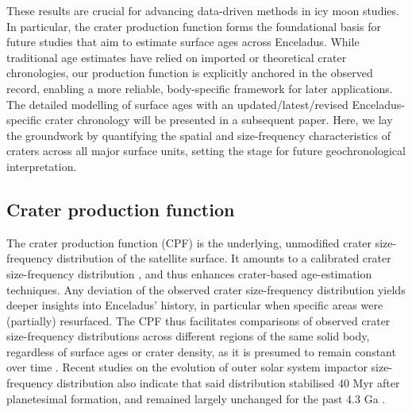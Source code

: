 \documentclass[preprint,12pt,3p,times,authoryear]{elsarticle}
\begin{document}
These results are crucial for advancing data-driven methods in icy moon studies. In particular, the crater production function forms the foundational basis for future studies that aim to estimate surface ages across Enceladus. While traditional age estimates have relied on imported or theoretical crater chronologies, our production function is explicitly anchored in the observed record, enabling a more reliable, body-specific framework for later applications. \\

The detailed modelling of surface ages with an updated/latest/revised Enceladus-specific crater chronology will be presented in a subsequent paper. Here, we lay the groundwork by quantifying the spatial and size-frequency characteristics of craters across all major surface units, setting the stage for future geochronological interpretation.

\subsection{Crater production function}
\label{sub:intro_cpf}
The crater production function (CPF) is the underlying, unmodified crater size-frequency distribution of the satellite surface. It amounts to a calibrated crater size-frequency distribution \citep{Neukum1975}, and thus enhances crater-based age-estimation techniques.
Any deviation of the observed crater size-frequency distribution yields deeper insights into Enceladus’ history, in particular when specific areas were (partially) resurfaced. The CPF thus facilitates comparisons of observed crater size-frequency distributions across different regions of the same solid body, regardless of surface ages or crater density, as it is presumed to remain constant over time \citep{Neukum1975,Neukum1983,Werner2014,Werner2023}.
Recent studies on the evolution of outer solar system impactor size-frequency distribution also indicate that said distribution stabilised 40 Myr after planetesimal formation, and remained largely unchanged for the past 4.3 Ga \citep{Bottke2024}.\\
\end{document}
